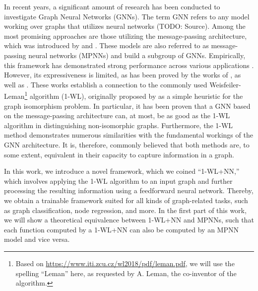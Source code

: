 In recent years, a significant amount of research has been conducted to investigate Graph Neural Networks (GNNs). The term GNN refers to any model working over graphs that utilizes neural networks (TODO: Source). Among the most promising approaches are those utilizing the message-passing architecture, which was introduced by \cite{Gil+2017} and \cite{Sca+2009}. These models are also referred to as message-passing neural networks (MPNNs) and build a subgroup of GNNs. Empirically, this framework has demonstrated strong performance across various applications \cite{Kip+2017, Ham+2017, Xu2018}. However, its expressiveness is limited, as has been proved by the works of \cite{Morris2018}, as well as \cite{Xu2018}. These works establish a connection to the commonly used Weisfeiler-Leman\footnote{Based on \href{https://www.iti.zcu.cz/wl2018/pdf/leman.pdf}{https://www.iti.zcu.cz/wl2018/pdf/leman.pdf}, we will use the spelling ``Leman'' here, as requested by A. Leman, the co-inventor of the algorithm.} algorithm (1-WL), originally proposed by \cite{Wei+1968} as a simple heuristic for the graph isomorphism problem. In particular, it has been proven that a GNN based on the message-passing architecture can, at most, be as good as the 1-WL algorithm in distinguishing non-isomorphic graphs. Furthermore, the 1-WL method demonstrates numerous similarities with the fundamental workings of the GNN architecture. It is, therefore, commonly believed that both methods are, to some extent, equivalent in their capacity to capture information in a graph.

In this work, we introduce a novel framework, which we coined ``1-WL+NN,'' which involves applying the 1-WL algorithm to an input graph and further processing the resulting information using a feedforward neural network. Thereby, we obtain a trainable framework suited for all kinds of graph-related tasks, such as graph classification, node regression, and more. In the first part of this work, we will show a theoretical equivalence between 1-WL+NN and MPNNs, such that each function computed by a 1-WL+NN can also be computed by an MPNN model and vice versa.

